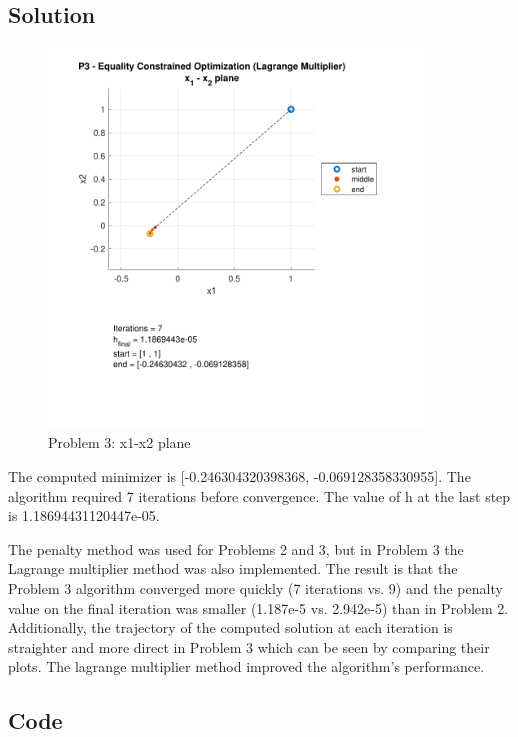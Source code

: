 \documentclass[conf]{new-aiaa}
\begin{document}

\subsection{Solution}

\begin{figure}[H]
	\begin{center}
		\includegraphics[width=0.9\textwidth]{P3 - Equality Constrained Optimization (Lagrange Multiplier) - x_1 - x_2 plane.pdf}
	\end{center}
	\caption{Problem 3: x1-x2 plane}
\end{figure}

The computed minimizer is [-0.246304320398368, -0.069128358330955]. The algorithm required 7 iterations before convergence. The value of h at the last step is 1.18694431120447e-05. 

The penalty method was used for Problems 2 and 3, but in Problem 3 the Lagrange multiplier method was also implemented. The result is that the Problem 3 algorithm converged more quickly (7 iterations vs. 9) and the penalty value on the final iteration was smaller (1.187e-5 vs. 2.942e-5) than in Problem 2. Additionally, the trajectory of the computed solution at each iteration is straighter and more direct in Problem 3 which can be seen by comparing their plots. The lagrange multiplier method improved the algorithm's performance. 

\subsection{Code}
\end{document}

